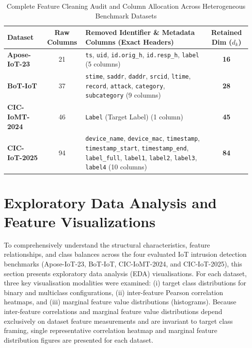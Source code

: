 \documentclass[a4paper,fleqn]{cas-sc}
\begin{document}
\begin{table}[h!]
\centering
\caption{Complete Feature Cleaning Audit and Column Allocation Across Heterogeneous Benchmark Datasets}
\label{tab:supp_feature_audit}
\begin{tabular}{lc p{7.5cm} c}
\toprule
\textbf{Dataset} & \textbf{Raw Columns} & \textbf{Removed Identifier \& Metadata Columns (Exact Headers)} & \textbf{Retained Dim ($d_k$)} \\
\midrule
\textbf{Apose-IoT-23} & 21 & \texttt{ts}, \texttt{uid}, \texttt{id.orig\_h}, \texttt{id.resp\_h}, \texttt{label} (5 columns) & \textbf{16} \\
\textbf{BoT-IoT} & 37 & \texttt{stime}, \texttt{saddr}, \texttt{daddr}, \texttt{srcid}, \texttt{ltime}, \texttt{record}, \texttt{attack}, \texttt{category}, \texttt{subcategory} (9 columns) & \textbf{28} \\
\textbf{CIC-IoMT-2024} & 46 & \texttt{Label} (Target Label) (1 column) & \textbf{45} \\
\textbf{CIC-IoT-2025} & 94 & \texttt{device\_name}, \texttt{device\_mac}, \texttt{timestamp}, \texttt{timestamp\_start}, \texttt{timestamp\_end}, \texttt{label\_full}, \texttt{label1}, \texttt{label2}, \texttt{label3}, \texttt{label4} (10 columns) & \textbf{84} \\
\bottomrule
\end{tabular}
\end{table}

\section{Exploratory Data Analysis and Feature Visualizations}
\label{sec:supp_eda_visualizations}

To comprehensively understand the structural characteristics, feature relationships, and class balances across the four evaluated IoT intrusion detection benchmarks (Apose-IoT-23, BoT-IoT, CIC-IoMT-2024, and CIC-IoT-2025), this section presents exploratory data analysis (EDA) visualisations. For each dataset, three key visualisation modalities were examined: (i) target class distributions for binary and multiclass configurations, (ii) inter-feature Pearson correlation heatmaps, and (iii) marginal feature value distributions (histograms). Because inter-feature correlations and marginal feature value distributions depend exclusively on dataset feature measurements and are invariant to target class framing, single representative correlation heatmap and marginal feature distribution figures are presented for each dataset.
\end{document}
